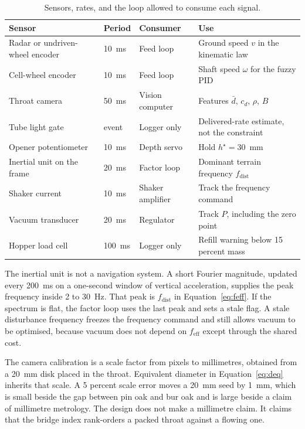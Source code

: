 \begin{table}[htbp]
\centering
\caption{Sensors, rates, and the loop allowed to consume each signal.}
\label{tab:sensors}
\begin{tabular}{@{}p{32mm}p{22mm}p{28mm}p{55mm}@{}}
\toprule
Sensor & Period & Consumer & Use \\
\midrule
Radar or undriven-wheel encoder & 10~ms & Feed loop & Ground speed $v$ in the kinematic law \\
Cell-wheel encoder & 10~ms & Feed loop & Shaft speed $\omega$ for the fuzzy PID \\
Throat camera & 50~ms & Vision computer & Features $\bar d$, $c_d$, $\rho$, $B$ \\
Tube light gate & event & Logger only & Delivered-rate estimate, not the constraint \\
Opener potentiometer & 10~ms & Depth servo & Hold $h^{\star}=30$~mm \\
Inertial unit on the frame & 20~ms & Factor loop & Dominant terrain frequency $f_{\mathrm{dist}}$ \\
Shaker current & 10~ms & Shaker amplifier & Track the frequency command \\
Vacuum transducer & 20~ms & Regulator & Track $P$, including the zero point \\
Hopper load cell & 100~ms & Logger only & Refill warning below 15 percent mass \\
\bottomrule
\end{tabular}
\end{table}

The inertial unit is not a navigation system. A short Fourier magnitude, updated every 200~ms on a one-second window of vertical acceleration, supplies the peak frequency inside 2 to 30~Hz. That peak is $f_{\mathrm{dist}}$ in Equation~\eqref{eq:feff}. If the spectrum is flat, the factor loop uses the last peak and sets a stale flag. A stale disturbance frequency freezes the frequency command and still allows vacuum to be optimised, because vacuum does not depend on $f_{\mathrm{eff}}$ except through the shared cost.

The camera calibration is a scale factor from pixels to millimetres, obtained from a 20~mm disk placed in the throat. Equivalent diameter in Equation~\eqref{eq:deq} inherits that scale. A 5 percent scale error moves a 20~mm seed by 1~mm, which is small beside the gap between pin oak and bur oak and is large beside a claim of millimetre metrology. The design does not make a millimetre claim. It claims that the bridge index rank-orders a packed throat against a flowing one.

